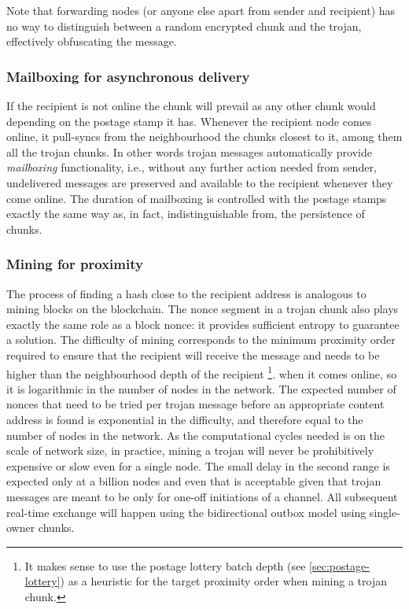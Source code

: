 Note that forwarding nodes (or anyone else apart from sender and recipient) has no way to distinguish between a random encrypted chunk and the trojan, effectively obfuscating the message.  

\subsubsection{Mailboxing for asynchronous delivery}

If the recipient is not online the chunk will prevail as any other chunk would depending on the postage stamp it has. Whenever the recipient node comes online, it pull-syncs from the neighbourhood the chunks closest to it, among them all the trojan chunks. In other words trojan messages automatically provide \emph{mailboxing} functionality, i.e., 
without any further action needed from sender, undelivered messages are preserved and available to the recipient whenever they come online. The duration of mailboxing is controlled with the postage stamps exactly the same way as, in fact, indistinguishable from, the persistence of chunks. 

\subsubsection{Mining for proximity}

The process of finding a hash close to the recipient address is analogous to mining blocks on the blockchain. The nonce segment in a trojan chunk also plays exactly the same role as a block nonce: it provides sufficient entropy to guarantee a solution. The difficulty of mining corresponds to the minimum proximity order required to ensure that the recipient will receive the message and needs to be higher than the neighbourhood depth of the recipient%
%
\footnote{It makes sense to use the postage lottery batch depth (see \ref{sec:postage-lottery}) as a heuristic for the target proximity order when mining a trojan chunk.}.
%
when it comes online, so it is logarithmic in the number of nodes in the network. The expected number of nonces that need to be tried per trojan message before an appropriate content address is found is exponential in the difficulty, and therefore equal to the number of nodes in the network. As the computational cycles needed is on the scale of network size, in practice, mining a trojan will never be prohibitively expensive or slow even for a single node. The small delay in the second range is expected only at a billion nodes and even that is acceptable given that trojan messages are meant to be only for one-off initiations of a channel. All subsequent real-time exchange will happen using the bidirectional outbox model using single-owner chunks.

